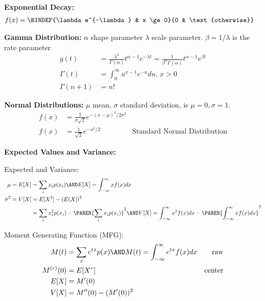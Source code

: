 \documentclass[10pt,a4paper]{report}
\begin{document}
\begin{description}
\begin{description}
	\item \textbf{Exponential Decay: }
	\begin{align*}
		f(x) &= \BINDEF{\lambda e^{-\lambda} & x \ge 0}{0 & \text{otherwise}}
	\end{align*}
	
	\item \textbf{Gamma Distribution: }$\alpha$ shape parameter $\lambda$ scale parameter.  $\beta = 1/\lambda$ is the rate parameter
	\begin{align*}
		g(t) &= \frac{\lambda^\alpha}{\Gamma(\alpha)}t^{\alpha-1}e^{-\lambda t} = \frac{1}{\beta^\alpha\Gamma(\alpha)}t^{\alpha-1}e^{\beta t} \\
		\Gamma(t) &= \int_0^\infty u^{x-1}e^{-u} du,\, x >0 \\
		\Gamma(n+1) &= n!
	\end{align*}
	
	\item \textbf{Normal Distributions:} $\mu$ mean, $\sigma$ standard deviation,  is $\mu=0, \sigma = 1$.
	\begin{align*}
		f(x) &= \frac{1}{\sigma\sqrt{2}}e^{-(x-\mu)^2/2\sigma^2} \\
		f(x) &= \frac{1}{\sqrt{2}}e^{-x^2/2} & \text{Standard Normal Distribution}
	\end{align*}
\end{description}
\item \textbf{Expected Values and Variance:}
	\begin{description}
		\item Expected and Variance:
		\begin{align*}
			\mu = E[X] &= \sum_i x_ip(x_i) \AND E[X] = \int_{-\infty}^\infty xf(x)dx \\
			\sigma^2 = V[X] &= E[X^2]-(E(X])^2\\
			&= \sum_i x_i^2p(x_i) - \PAREN{\sum_i x_ip(x_i)}^2 \AND V[X] = \int_{-\infty}^\infty x^2f(x)dx - \PAREN{\int_{-\infty}^\infty xf(x)dx}^2
		\end{align*}
		\item Moment Generating Function (MFG):
		\begin{align*}
			M(t) &= \sum_x e^{tx} p(x) \AND M(t)=\int_{-\infty}^\infty e^{tx}f(x)dx & \text{raw}\\
			M^{(r)}(0) &= E[X^r] & \text{center} \\
			E[X] &= M'(0)\\
			V[X] &= M''(0) - (M'(0))^2
		\end{align*}
	\end{description}

\end{description}
\end{document}
